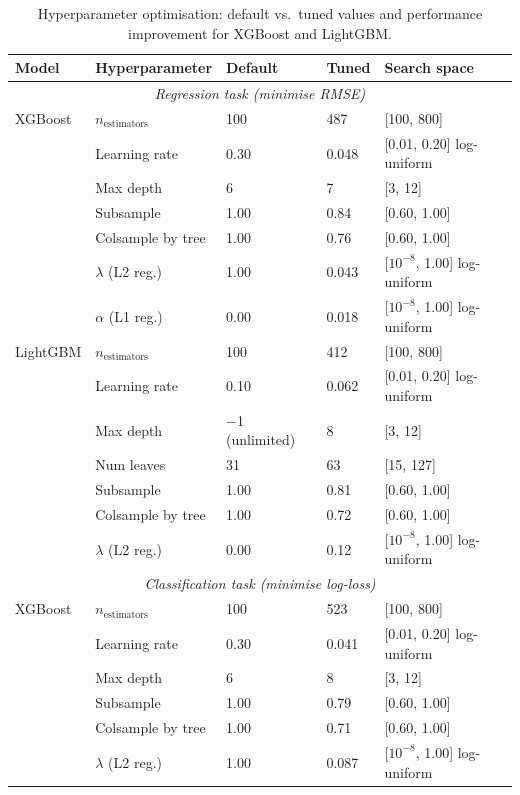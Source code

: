 \begin{table}[tb]
\centering
\small
\caption{Hyperparameter optimisation: default vs.\ tuned values and performance improvement for XGBoost and LightGBM.\label{tab:hyperparameters}}
\begin{tabular}{@{}lllll@{}}
\toprule
\textbf{Model} & \textbf{Hyperparameter} & \textbf{Default} & \textbf{Tuned} & \textbf{Search space} \\
\midrule
\multicolumn{5}{c}{\textit{Regression task (minimise RMSE)}} \\
\midrule
XGBoost & $n_{\text{estimators}}$ & 100 & 487 & [100, 800] \\
 & Learning rate & 0.30 & 0.048 & [0.01, 0.20] log-uniform \\
 & Max depth & 6 & 7 & [3, 12] \\
 & Subsample & 1.00 & 0.84 & [0.60, 1.00] \\
 & Colsample by tree & 1.00 & 0.76 & [0.60, 1.00] \\
 & $\lambda$ (L2 reg.) & 1.00 & 0.043 & [$10^{-8}$, 1.00] log-uniform \\
 & $\alpha$ (L1 reg.) & 0.00 & 0.018 & [$10^{-8}$, 1.00] log-uniform \\
\midrule
LightGBM & $n_{\text{estimators}}$ & 100 & 412 & [100, 800] \\
 & Learning rate & 0.10 & 0.062 & [0.01, 0.20] log-uniform \\
 & Max depth & $-$1 (unlimited) & 8 & [3, 12] \\
 & Num leaves & 31 & 63 & [15, 127] \\
 & Subsample & 1.00 & 0.81 & [0.60, 1.00] \\
 & Colsample by tree & 1.00 & 0.72 & [0.60, 1.00] \\
 & $\lambda$ (L2 reg.) & 0.00 & 0.12 & [$10^{-8}$, 1.00] log-uniform \\
\midrule
\multicolumn{5}{c}{\textit{Classification task (minimise log-loss)}} \\
\midrule
XGBoost & $n_{\text{estimators}}$ & 100 & 523 & [100, 800] \\
 & Learning rate & 0.30 & 0.041 & [0.01, 0.20] log-uniform \\
 & Max depth & 6 & 8 & [3, 12] \\
 & Subsample & 1.00 & 0.79 & [0.60, 1.00] \\
 & Colsample by tree & 1.00 & 0.71 & [0.60, 1.00] \\
 & $\lambda$ (L2 reg.) & 1.00 & 0.087 & [$10^{-8}$, 1.00] log-uniform \\

\end{tabular}
\end{table}
